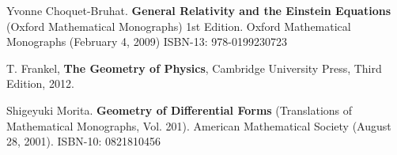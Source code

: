 \documentclass[10pt]{amsart}
\begin{document}
\begin{thebibliography}{9}
Yvonne Choquet-Bruhat.  \textbf{General Relativity and the Einstein Equations} (Oxford Mathematical Monographs) 1st Edition.  Oxford Mathematical Monographs (February 4, 2009) ISBN-13: 978-0199230723

T. Frankel,
\textbf{The Geometry of Physics}, 
Cambridge University Press, 
Third Edition,
2012.

Shigeyuki Morita. \textbf{Geometry of Differential Forms} (Translations of Mathematical Monographs, Vol. 201). American Mathematical Society (August 28, 2001). ISBN-10: 0821810456



\end{thebibliography}
\end{document}
